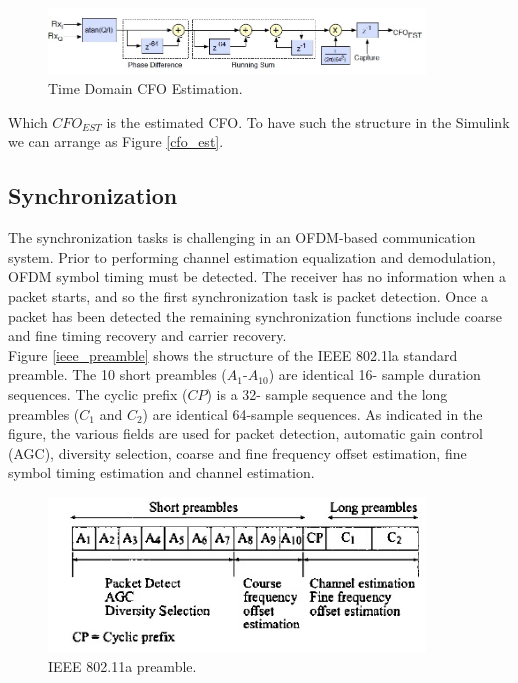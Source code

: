 \begin{figure}[h!]
\centering
\includegraphics[width=10cm]{content/fig/cfo_est.JPG}
\caption{Time Domain CFO Estimation.}
\label{fig:cfo_est}
\end{figure}

Which $CFO_{EST}$ is the estimated CFO. To have such the structure in the Simulink we can arrange as Figure \ref{cfo_est}.

\subsection{Synchronization}
\label{section:sync}

The synchronization tasks is challenging in an OFDM-based communication system. Prior to performing channel estimation equalization and demodulation, OFDM symbol timing must be detected. The receiver has no information when a packet starts, and so the first synchronization task is packet detection. Once a packet has been detected the remaining synchronization functions include coarse and fine timing recovery and carrier recovery.\\
Figure \ref{ieee_preamble} shows the structure of the IEEE 802.1la standard preamble. The 10 short preambles ($A_{1}$-$A_{10}$) are identical 16- sample duration sequences. The cyclic prefix ($CP$) is a 32- sample sequence and the long preambles ($C_{1}$ and $C_{2}$) are identical 64-sample sequences. As indicated in the figure, the various fields are used for packet detection, automatic gain control (AGC), diversity selection, coarse and fine frequency offset estimation, fine symbol timing estimation and channel estimation.\\

\begin{figure}[h!]
\centering
\includegraphics[width=10cm]{content/fig/ieee_preamble.JPG}
\caption{IEEE 802.11a preamble.}
\label{fig:ieee_preamble}
\end{figure}

